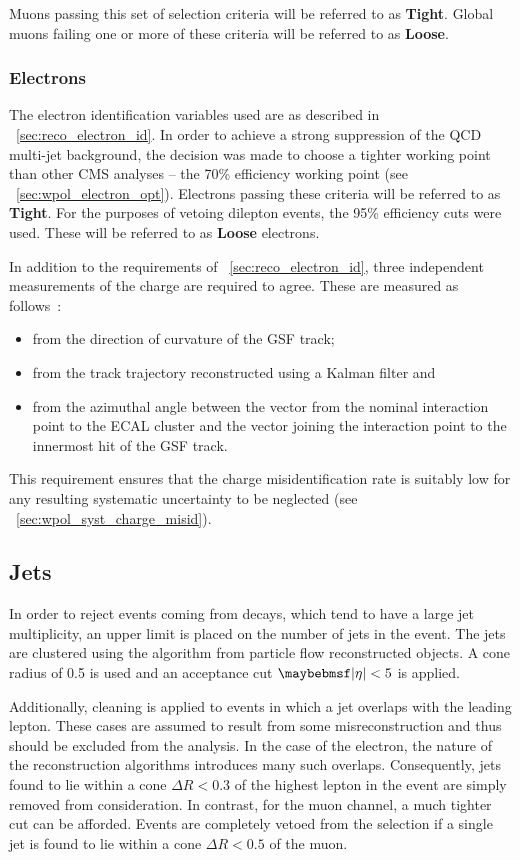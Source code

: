 Muons passing this set of selection criteria will be referred to as
\textbf{Tight}. Global muons failing one or more of these criteria will be
referred to as \textbf{Loose}.

\subsubsection{Electrons}
\label{sec:wpol_electronid}
The electron identification variables used are as described in
\sec~\ref{sec:reco_electron_id}. In order to achieve a strong suppression of
the \ac{QCD} multi-jet background, the decision was made to choose a tighter
working point than other \ac{CMS} analyses -- the 70\% efficiency working point
(see \sec~\ref{sec:wpol_electron_opt}). Electrons passing these criteria will
be referred to as \textbf{Tight}. For the purposes of vetoing dilepton events,
the 95\% efficiency cuts were used. These will be referred to as \textbf{Loose}
electrons.

In addition to the requirements of \sec~\ref{sec:reco_electron_id}, three independent
measurements of the charge are required to agree. These are measured as follows~\cite{wcharge_asymm2}:
\begin{itemize}
\item from the direction of curvature of the \ac{GSF} track;
\item from the track trajectory reconstructed using a Kalman filter and
\item from the azimuthal angle between the vector from the nominal interaction
  point to the \ac{ECAL} cluster and the vector joining the interaction point to
  the innermost hit of the \ac{GSF} track.
\end{itemize}
This requirement ensures that the charge misidentification rate is suitably low
for any resulting systematic uncertainty to be neglected (see
\sec~\ref{sec:wpol_syst_charge_misid}).

\subsection{Jets}
\label{sec:wpol_jets}
In order to reject events coming from \ttbar decays, which tend to have a large
jet multiplicity, an upper limit is placed on the number of jets in the
event. The jets are clustered using the \antikT algorithm from particle flow
reconstructed objects. A cone radius of 0.5 is used and an acceptance cut
$\modeta < 5$ is applied.

Additionally, cleaning is applied to events in which a jet overlaps with the
leading lepton. These cases are assumed to result from some misreconstruction
and thus should be excluded from the analysis. In the case of the electron, the
nature of the reconstruction algorithms introduces many such
overlaps. Consequently, jets found to lie within a cone $\Delta R < 0.3$ of the
highest \Pt lepton in the event are simply removed from consideration. In
contrast, for the muon channel, a much tighter cut can be afforded. Events are
completely vetoed from the selection if a single jet is found to lie within a
cone $\Delta R < 0.5$ of the muon.

